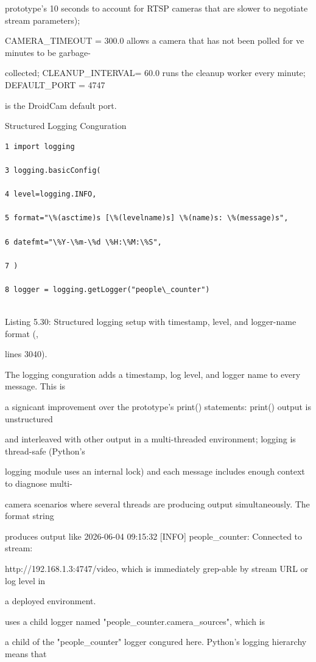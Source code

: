 prototype's 10 seconds to account for RTSP cameras that are slower to negotiate stream parameters);

CAMERA\_TIMEOUT = 300.0 allows a camera that has not been polled for ve minutes to be garbage-

collected; CLEANUP\_INTERVAL= 60.0 runs the cleanup worker every minute; DEFAULT\_PORT = 4747

is the DroidCam default port.

Structured Logging Conguration

\begin{listingbox}
	\begin{verbatim}
1 import logging

3 logging.basicConfig(

4 level=logging.INFO,

5 format="\%(asctime)s [\%(levelname)s] \%(name)s: \%(message)s",

6 datefmt="\%Y-\%m-\%d \%H:\%M:\%S",

7 )

8 logger = logging.getLogger("people\_counter")


\end{verbatim}
\end{listingbox}
Listing 5.30: Structured logging setup with timestamp, level, and logger-name format (,

lines 3040).

The logging conguration adds a timestamp, log level, and logger name to every message. This is

a signicant improvement over the prototype's print() statements: print() output is unstructured

and interleaved with other output in a multi-threaded environment; logging is thread-safe (Python's

logging module uses an internal lock) and each message includes enough context to diagnose multi-

camera scenarios where several threads are producing output simultaneously. The format string

produces output like  2026-06-04 09:15:32 [INFO] people\_counter: Connected to stream:

http://192.168.1.3:4747/video, which is immediately grep-able by stream URL or log level in

a deployed environment.

uses a child logger named "people\_counter.camera\_sources", which is

a child of the "people\_counter" logger congured here. Python's logging hierarchy means that

